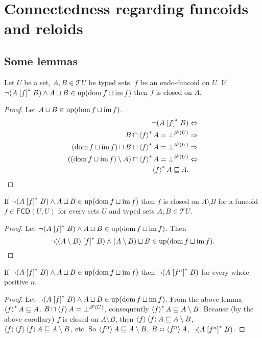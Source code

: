 
\chapter{Connectedness regarding funcoids and reloids}


\section{Some lemmas}
\begin{lem}
Let $U$ be a set, $A,B\in\mathscr{T}U$ be typed sets, $f$ be an
endo-funcoid on $U$. If $\neg(A\mathrel{\left[f\right]^{\ast}}B)\wedge A\sqcup B\in\operatorname{up}(\operatorname{dom} f\sqcup\operatorname{im} f)$
then $f$ is closed on $A$.\end{lem}
\begin{proof}
Let $A\sqcup B\in\operatorname{up}(\operatorname{dom} f\sqcup\operatorname{im} f)$.
\begin{align*}
\lnot(A\mathrel{\left[f\right]^{\ast}}B) & \Leftrightarrow\\
B\sqcap\left\langle f\right\rangle ^{\ast}A=\bot^{\mathscr{F}(U)} & \Rightarrow\\
(\operatorname{dom} f\sqcup\operatorname{im} f)\sqcap B\sqcap\left\langle f\right\rangle ^{\ast}A=\bot^{\mathscr{F}(U)} & \Rightarrow\\
((\operatorname{dom} f\sqcup\operatorname{im} f)\setminus A)\sqcap\left\langle f\right\rangle ^{\ast}A=\bot^{\mathscr{F}(U)} & \Leftrightarrow\\
\left\langle f\right\rangle ^{\ast}A\sqsubseteq A.
\end{align*}
\end{proof}
\begin{cor}
If $\neg(A\mathrel{\left[f\right]^{\ast}}B)\wedge A\sqcup B\in\operatorname{up}(\operatorname{dom} f\sqcup\operatorname{im} f)$ then
$f$ is closed on $A\setminus B$ for a funcoid $f\in\mathsf{FCD}(U,U)$
for every sets $U$ and typed sets $A,B\in\mathscr{T}U$.\end{cor}
\begin{proof}
Let $\neg(A\mathrel{\left[f\right]^{\ast}}B)\wedge A\sqcup B\in\operatorname{up}(\operatorname{dom} f\sqcup\operatorname{im} f)$. Then
\[
\lnot((A\setminus B)\mathrel{\left[f\right]^{\ast}}B)\land(A\setminus B)\sqcup B\in\operatorname{up}(\operatorname{dom} f\sqcup\operatorname{im} f).
\]
\end{proof}
\begin{lem}
If $\neg(A\mathrel{\left[f\right]^{\ast}}B)\wedge A\sqcup B\in\operatorname{up}(\operatorname{dom} f\sqcup\operatorname{im} f)$ then
$\lnot(A\mathrel{\left[f^{n}\right]^{\ast}}B)$ for every whole positive $n$.\end{lem}
\begin{proof}
Let $\neg(A\mathrel{\left[f\right]^{\ast}}B)\wedge A\sqcup B\in\operatorname{up}(\operatorname{dom} f\sqcup\operatorname{im} f)$. From
the above lemma $\left\langle f\right\rangle ^{\ast}A\sqsubseteq A$. $B\sqcap\left\langle f\right\rangle A=\bot^{\mathscr{F}(U)}$,
consequently $\left\langle f\right\rangle ^{\ast}A\sqsubseteq A\setminus B$. Because (by the
above corollary) $f$ is closed on $A\setminus B$, then $\left\langle f\right\rangle\left\langle f\right\rangle A\sqsubseteq A\setminus B$,
$\left\langle f\right\rangle\left\langle f\right\rangle\left\langle f\right\rangle A\sqsubseteq A\setminus B$, etc. So $\left\langle f^{n}\right\rangle A\sqsubseteq A\setminus B$,
$B\asymp\left\langle f^{n}\right\rangle A$, $\lnot(A\mathrel{\left[f^{n}\right]^{\ast}}B)$.
\end{proof}

